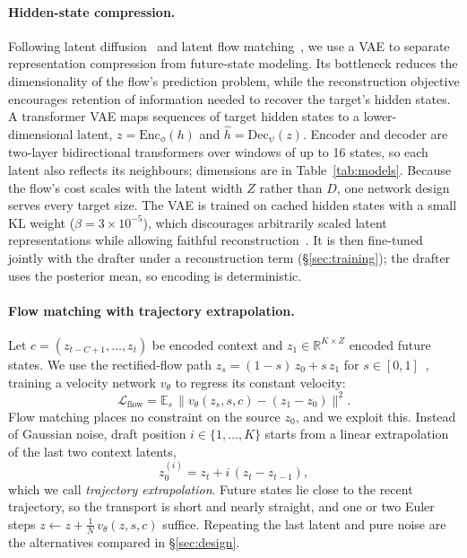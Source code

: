 \documentclass{article}
\begin{document}
\paragraph{Hidden-state compression.}
Following latent diffusion~\citep{rombach2022latentdiffusion} and latent
flow matching~\citep{dao2023latentflow,esser2024rectifiedflow}, we use a VAE
to separate representation compression from future-state modeling. Its
bottleneck reduces the dimensionality of the flow's prediction problem,
while the reconstruction objective encourages retention of information
needed to recover the target's hidden states.
A transformer VAE maps sequences of target hidden states to a
lower-dimensional latent, $z=\mathrm{Enc}_\phi(h)$ and
$\hat h=\mathrm{Dec}_\psi(z)$. Encoder and decoder are two-layer
bidirectional transformers over windows of up to 16 states, so each latent
also reflects its neighbours; dimensions are in Table~\ref{tab:models}.
Because the flow's cost scales with the latent width $Z$ rather than $D$,
one network design serves every target size. The VAE is trained on cached
hidden states with a small KL weight ($\beta=3\times10^{-5}$), which
discourages arbitrarily scaled latent representations while allowing
faithful reconstruction~\citep{rombach2022latentdiffusion}. It is then
fine-tuned jointly with the drafter under a reconstruction term
(\S\ref{sec:training}); the drafter uses the posterior mean, so encoding is
deterministic.

\paragraph{Flow matching with trajectory extrapolation.}
Let $c=(z_{t-C+1},\dots,z_t)$ be encoded context and
$z_1\in\mathbb{R}^{K\times Z}$ encoded future states. We use the
rectified-flow path $z_s=(1-s)\,z_0+s\,z_1$ for
$s\in[0,1]$~\citep{lipman2023flowmatching}, training a velocity network
$v_\theta$ to regress its constant velocity:
\begin{equation}
\mathcal{L}_{\mathrm{flow}}
 = \mathbb{E}_{s}\,\big\| v_\theta(z_s, s, c) - (z_1 - z_0) \big\|^2 .
\label{eq:flow}
\end{equation}
Flow matching places no constraint on the source $z_0$, and we exploit this.
Instead of Gaussian noise, draft position $i\in\{1,\dots,K\}$ starts from a
linear extrapolation of the last two context latents,
\begin{equation}
z_0^{(i)} = z_t + i\,(z_t - z_{t-1}),
\label{eq:source}
\end{equation}
which we call \emph{trajectory extrapolation}. Future
states lie close to the recent trajectory, so the transport is short and
nearly straight, and one or two Euler steps
$z\leftarrow z+\tfrac{1}{N}\,v_\theta(z,s,c)$ suffice. Repeating the last
latent and pure noise are the alternatives compared in \S\ref{sec:design}.
\end{document}
